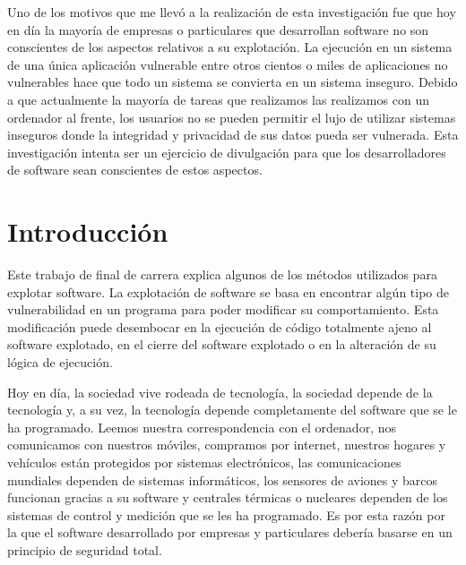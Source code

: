 \documentclass [titlepage, 12pt]{article}
\begin{document}
Uno de los motivos que me llev\'o a la realizaci\'on de esta investigaci\'on fue que hoy en d\'ia la mayor\'ia de empresas o particulares que desarrollan software no son conscientes de los aspectos relativos a su explotaci\'on. La ejecuci\'on en un sistema de una \'unica aplicaci\'on vulnerable entre otros cientos o miles de aplicaciones no vulnerables hace que todo un sistema se convierta en un sistema inseguro. Debido a que actualmente la mayor\'ia de tareas que realizamos las realizamos con un ordenador al frente, los usuarios no se pueden permitir el lujo de utilizar sistemas inseguros donde la integridad y privacidad de sus datos pueda ser vulnerada. Esta investigaci\'on intenta ser un ejercicio de divulgaci\'on para que los desarrolladores de software sean conscientes de estos aspectos.


\pagebreak
\setcounter{page}{1}
\tableofcontents
\newpage

\listoftables 

\listoffigures

\pagebreak

\section {Introducci\'on}

\bigskip
Este trabajo de final de carrera explica algunos de los m\'etodos utilizados para explotar software. La explotaci\'on de software se basa en encontrar alg\'un tipo de vulnerabilidad en un programa para poder modificar su comportamiento. Esta modificaci\'on puede desembocar en la ejecuci\'on de c\'odigo totalmente ajeno al software explotado, en el cierre del software explotado o en la alteraci\'on de su l\'ogica de ejecuci\'on. \bigskip

Hoy en d\'ia, la sociedad vive rodeada de tecnolog\'ia, la sociedad depende de la tecnolog\'ia y, a su vez, la tecnolog\'ia depende completamente del software que se le ha programado. Leemos nuestra correspondencia con el ordenador, nos comunicamos con nuestros m\'oviles, compramos por internet, nuestros hogares y veh\'iculos est\'an protegidos por sistemas electr\'onicos, las comunicaciones mundiales dependen de sistemas inform\'aticos, los sensores de aviones y barcos funcionan gracias a su software y centrales t\'ermicas o nucleares dependen de los sistemas de control y medici\'on que se les ha programado. Es por esta raz\'on por la que el software desarrollado por empresas y particulares deber\'ia basarse en un principio de seguridad total. \bigskip
\end{document}
